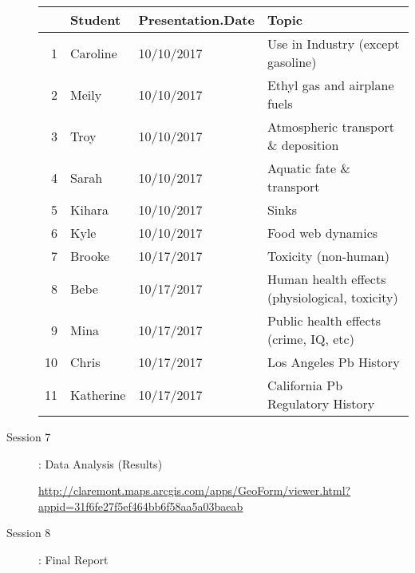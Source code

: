 \documentclass{article}\usepackage[]{graphicx}\usepackage[]{color}
\begin{document}
\begin{description}
\begin{table}[ht]
\centering
\begin{tabular}{rlll}
  \hline
 & Student & Presentation.Date & Topic \\ 
  \hline
1 & Caroline & 10/10/2017 & Use in Industry (except gasoline) \\ 
  2 & Meily & 10/10/2017 & Ethyl gas and airplane fuels \\ 
  3 & Troy & 10/10/2017 & Atmospheric transport \& deposition \\ 
  4 & Sarah & 10/10/2017 & Aquatic fate \& transport \\ 
  5 & Kihara & 10/10/2017 & Sinks \\ 
  6 & Kyle & 10/10/2017 & Food web dynamics \\ 
  7 & Brooke & 10/17/2017 & Toxicity (non-human) \\ 
  8 & Bebe & 10/17/2017 & Human health effects (physiological, toxicity) \\ 
  9 & Mina & 10/17/2017 & Public health effects (crime, IQ, etc) \\ 
  10 & Chris & 10/17/2017 & Los Angeles Pb History \\ 
  11 & Katherine & 10/17/2017 & California Pb Regulatory History \\ 
   \hline
\end{tabular}
\end{table}



  \item[Session 7]: Data Analysis (Results)

\url{http://claremont.maps.arcgis.com/apps/GeoForm/viewer.html?appid=31f6fe27f5ef464bb6f58aa5a03baeab}

\item[Session 8]: Final Report

\end{description}
\end{document}
